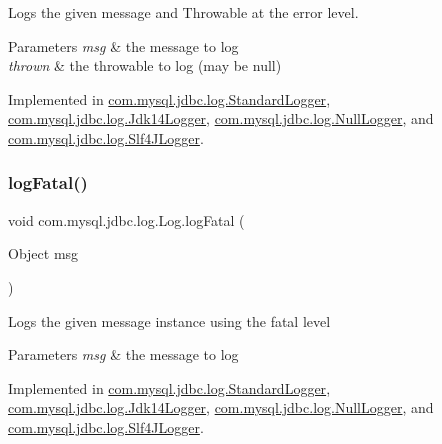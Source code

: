 Logs the given message and Throwable at the \textquotesingle{}error\textquotesingle{} level.


\begin{DoxyParams}{Parameters}
{\em msg} & the message to log \\
\hline
{\em thrown} & the throwable to log (may be null) \\
\hline
\end{DoxyParams}


Implemented in \mbox{\hyperlink{classcom_1_1mysql_1_1jdbc_1_1log_1_1_standard_logger_a92546621212faa486bfeb5572e55a48a}{com.\+mysql.\+jdbc.\+log.\+Standard\+Logger}}, \mbox{\hyperlink{classcom_1_1mysql_1_1jdbc_1_1log_1_1_jdk14_logger_a50ddfb22be744767635555b7d28333ff}{com.\+mysql.\+jdbc.\+log.\+Jdk14\+Logger}}, \mbox{\hyperlink{classcom_1_1mysql_1_1jdbc_1_1log_1_1_null_logger_a2488e3fd92fcca69b2bc07f10b369270}{com.\+mysql.\+jdbc.\+log.\+Null\+Logger}}, and \mbox{\hyperlink{classcom_1_1mysql_1_1jdbc_1_1log_1_1_slf4_j_logger_ad89a6c7655848b87de7ca278e6061688}{com.\+mysql.\+jdbc.\+log.\+Slf4\+J\+Logger}}.

\mbox{\label{interfacecom_1_1mysql_1_1jdbc_1_1log_1_1_log_a8d3b6b295ded6eaa1bfa50ffca6a4d28}} 
\subsubsection{\texorpdfstring{log\+Fatal()}{logFatal()}\hspace{0.1cm}{\footnotesize\ttfamily [1/2]}}
{\footnotesize\ttfamily void com.\+mysql.\+jdbc.\+log.\+Log.\+log\+Fatal (\begin{DoxyParamCaption}\item[{Object}]{msg }\end{DoxyParamCaption})}

Logs the given message instance using the \textquotesingle{}fatal\textquotesingle{} level


\begin{DoxyParams}{Parameters}
{\em msg} & the message to log \\
\hline
\end{DoxyParams}


Implemented in \mbox{\hyperlink{classcom_1_1mysql_1_1jdbc_1_1log_1_1_standard_logger_a667dcddbec69b9f552a2c765b5396d36}{com.\+mysql.\+jdbc.\+log.\+Standard\+Logger}}, \mbox{\hyperlink{classcom_1_1mysql_1_1jdbc_1_1log_1_1_jdk14_logger_a38b5dd14e2ef24972f6a7bda99231544}{com.\+mysql.\+jdbc.\+log.\+Jdk14\+Logger}}, \mbox{\hyperlink{classcom_1_1mysql_1_1jdbc_1_1log_1_1_null_logger_affbd0fc8b13b06f765195be1de3b4535}{com.\+mysql.\+jdbc.\+log.\+Null\+Logger}}, and \mbox{\hyperlink{classcom_1_1mysql_1_1jdbc_1_1log_1_1_slf4_j_logger_ab003102c3b7864c6d3bb2560cff3dbfa}{com.\+mysql.\+jdbc.\+log.\+Slf4\+J\+Logger}}.

